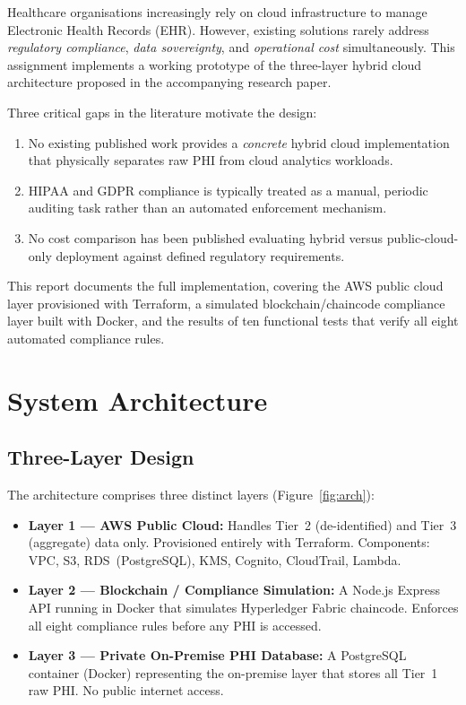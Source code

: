 \documentclass[12pt,a4paper]{article}
\begin{document}
Healthcare organisations increasingly rely on cloud infrastructure to manage
Electronic Health Records (EHR). However, existing solutions rarely address
\emph{regulatory compliance}, \emph{data sovereignty}, and \emph{operational cost}
simultaneously. This assignment implements a working prototype of the three-layer
hybrid cloud architecture proposed in the accompanying research paper.

Three critical gaps in the literature motivate the design:
\begin{enumerate}
  \item No existing published work provides a \emph{concrete} hybrid cloud implementation that physically separates raw PHI from cloud analytics workloads.
  \item HIPAA and GDPR compliance is typically treated as a manual, periodic auditing task rather than an automated enforcement mechanism.
  \item No cost comparison has been published evaluating hybrid versus public-cloud-only deployment against defined regulatory requirements.
\end{enumerate}

This report documents the full implementation, covering the AWS public cloud layer
provisioned with Terraform, a simulated blockchain/chaincode compliance layer built
with Docker, and the results of ten functional tests that verify all eight automated
compliance rules.

\section{System Architecture}

\subsection{Three-Layer Design}

The architecture comprises three distinct layers (Figure~\ref{fig:arch}):

\begin{itemize}
  \item \textbf{Layer 1 — AWS Public Cloud:} Handles Tier~2 (de-identified) and Tier~3 (aggregate) data only. Provisioned entirely with Terraform. Components: VPC, S3, RDS~(PostgreSQL), KMS, Cognito, CloudTrail, Lambda.
  \item \textbf{Layer 2 — Blockchain / Compliance Simulation:} A Node.js Express API running in Docker that simulates Hyperledger Fabric chaincode. Enforces all eight compliance rules before any PHI is accessed.
  \item \textbf{Layer 3 — Private On-Premise PHI Database:} A PostgreSQL container (Docker) representing the on-premise layer that stores all Tier~1 raw PHI. No public internet access.
\end{itemize}
\end{document}
